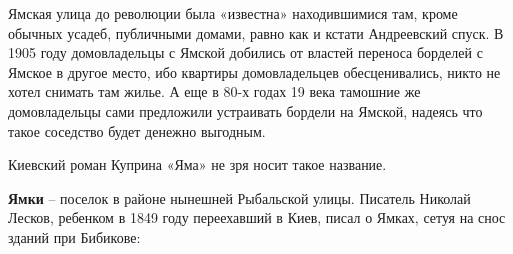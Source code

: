 Ямская улица до революции была «известна» находившимися там, кроме обычных усадеб, публичными домами, равно как и кстати Андреевский спуск. В 1905 году домовладельцы с Ямской добились от властей переноса борделей с Ямское в другое место, ибо квартиры домовладельцев обесценивались, никто не хотел снимать там жилье. А еще в 80-х годах 19 века тамошние же домовладельцы сами предложили устраивать бордели на Ямской, надеясь что такое соседство будет денежно выгодным.

Киевский роман Куприна «Яма» не зря носит такое название.\\

\medskip

\textbf{Ямки} – поселок в районе нынешней Рыбальской улицы. Писатель Николай Лесков, ребенком в 1849 году переехавший в Киев, писал о Ямках, сетуя на снос зданий при Бибикове:

